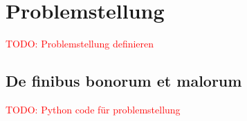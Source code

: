 %
%
%
\section{Problemstellung
\label{quadratur:section:problemstellung}}
\textcolor{red}{TODO: Problemstellung definieren}

\subsection{De finibus bonorum et malorum
\label{quadratur:subsection:finibus}}
\textcolor{red}{TODO: Python code für problemstellung}